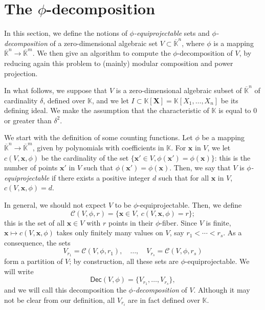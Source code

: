 \documentclass[12pt]{article}
\def\K {\ensuremath{\mathbb{K}}}
\def\Kbar {\ensuremath{\overline{\mathbb{K}}}}
\def\x {\ensuremath{\mathbf{x}}}
\def\X {\ensuremath{\mathbf{X}}}
\def\Dec {\ensuremath{\mathsf{Dec}}}
\begin{document}
\section{The $\phi$-decomposition}\label{sec:CtoE}

In this section, we define the notions of {\em $\phi$-equiprojectable}
sets and {\em $\phi$-decomposition} of a zero-dimensional algebraic
set $V\subset \Kbar^n$, where $\phi$ is a mapping $\Kbar^n \to
\Kbar^m$. We then give an algorithm to compute the
$\phi$-decomposition of $V$, by reducing again this problem to
(mainly) modular composition and power projection.

In what follows, we suppose that $V$ is a zero-dimensional algebraic
subset of $\Kbar^n$ of cardinality $\delta$, defined over $\K$, and we
let $I \subset \K[\X]=\K[X_1,\dots,X_n]$ be its defining ideal. We
make the assumption that the characteristic of $\K$ is equal to $0$ or
greater than $\delta^2$.

We start with the definition of some counting functions. Let $\phi$ be
a mapping $\Kbar^n\to \Kbar^m$, given by polynomials with coefficients
in $\K$. For $\x$ in $V$, we let $c(V,\x, \phi)$ be the cardinality of
the set $\{\x' \in V, \phi(\x')=\phi(\x)\}$: this is the number of
points $\x'$ in $V$ such that $\phi(\x')=\phi(\x)$. Then, we say that
$V$ is {\em $\phi$-equiprojectable} if there exists a positive integer
$d$ such that for all $\x$ in $V$, $c(V,\x,\phi)=d$.

In general, we should not expect $V$ to be $\phi$-equiprojectable.
Then, we define
\[
\mathscr{C}(V,\phi,r)=\{\x \in V,\ c(V,\x,\phi)=r\};
\]
this is the set of all $\x \in V$ with $r$ points in their
$\phi$-fiber. Since $V$ is finite, $\x\mapsto c(V,\x,\phi)$ takes only
finitely many values on $V$, say $r_1 < \cdots < r_s$.  As a
consequence, the sets
\begin{equation}\label{eq:Vri}
  V_{r_1} = \mathscr{C}(V,\phi,r_1),\quad \dots,\quad V_{r_s} = \mathscr{C}(V,\phi,r_s) 
\end{equation}
form a partition of $V$; by construction, all these sets are
$\phi$-equiprojectable. We will write
$$\Dec(V,\phi) =\{V_{r_1},\dots,V_{r_s}\},$$ and we will call this
decomposition the {\em $\phi$-decomposition} of $V$.  Although it may
not be clear from our definition, all $V_{r_i}$ are in fact defined
over $\K$.
\end{document}
